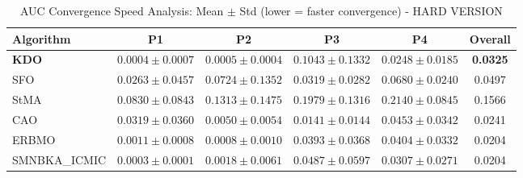 \begin{table}[htbp]
\centering
\caption{AUC Convergence Speed Analysis: Mean $\pm$ Std (lower = faster convergence) - HARD VERSION}
\label{tab:auc}
\small
\begin{tabular}{lccccc}
\toprule
\textbf{Algorithm} & \textbf{P1} & \textbf{P2} & \textbf{P3} & \textbf{P4} & \textbf{Overall} \\
\midrule
\textbf{KDO} & $0.0004 \pm 0.0007$ & $0.0005 \pm 0.0004$ & $0.1043 \pm 0.1332$ & $0.0248 \pm 0.0185$ & \textbf{0.0325} \\
SFO & $0.0263 \pm 0.0457$ & $0.0724 \pm 0.1352$ & $0.0319 \pm 0.0282$ & $0.0680 \pm 0.0240$ & 0.0497 \\
StMA & $0.0830 \pm 0.0843$ & $0.1313 \pm 0.1475$ & $0.1979 \pm 0.1316$ & $0.2140 \pm 0.0845$ & 0.1566 \\
CAO & $0.0319 \pm 0.0360$ & $0.0050 \pm 0.0054$ & $0.0141 \pm 0.0144$ & $0.0453 \pm 0.0342$ & 0.0241 \\
ERBMO & $0.0011 \pm 0.0008$ & $0.0008 \pm 0.0010$ & $0.0393 \pm 0.0368$ & $0.0404 \pm 0.0332$ & 0.0204 \\
SMNBKA_ICMIC & $0.0003 \pm 0.0001$ & $0.0018 \pm 0.0061$ & $0.0487 \pm 0.0597$ & $0.0307 \pm 0.0271$ & 0.0204 \\
\bottomrule
\end{tabular}
\end{table}
